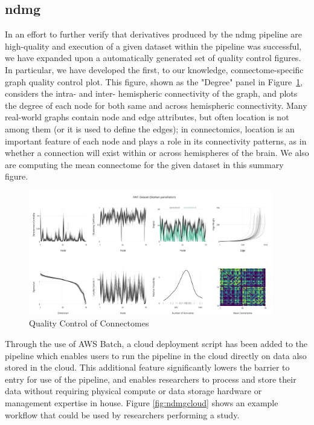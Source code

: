 \documentclass[simplex.tex]{subfiles}
\begin{document}
\subsection{ndmg}

In an effort to further verify that derivatives produced by the ndmg pipeline are high-quality and execution of a
given dataset within the pipeline was successful, we have expanded upon a automatically generated set of quality
control figures. In particular, we have developed the first, to our knowledge, connectome-specific graph quality
control plot. This figure, shown as the "Degree" panel in Figure~\ref{fig:ndmgqc}, considers the intra- and inter-
hemispheric connectivity of the graph, and plots the degree of each node for both same and across hemispheric
connectivity. Many real-world graphs contain node and edge attributes, but often location is not among them (or it
is used to define the edges); in connectomics, location is an important feature of each node and plays a role in its
connectivity patterns, as in whether a connection will exist within or across hemispheres of the brain. We also are
computing the mean connectome for the given dataset in this summary figure.

\begin{figure}[h!]
\begin{cframed}
\centering
\includegraphics[width=0.95\textwidth]{../../figs/ndmgqcnew.png}
\caption{Quality Control of Connectomes}
\label{fig:ndmgqc}
\end{cframed}
\end{figure}

Through the use of AWS Batch, a cloud deployment script has been added to the pipeline which enables users to run the
pipeline in the cloud directly on data also stored in the cloud. This additional feature significantly lowers the
barrier to entry for use of the pipeline, and enables researchers to process and store their data without requiring
physical compute or data storage hardware or management expertise in house. Figure \ref{fig:ndmgcloud} shows an example
workflow that could be used by researchers performing a study.
\clearpage
\end{document}
